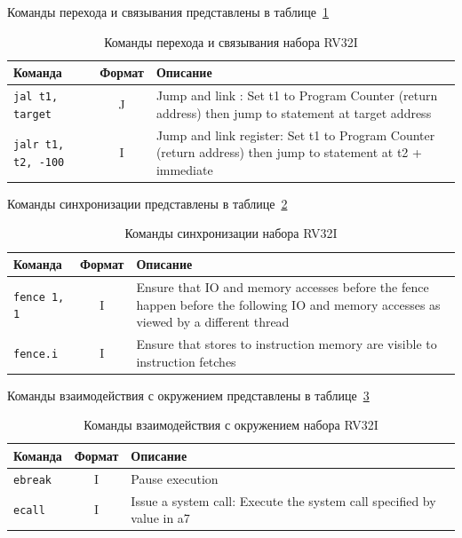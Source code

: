 Команды перехода и связывания представлены в таблице~\ref{table-base-jump}

\begin{table}[h]
    \caption{Команды перехода и связывания набора RV32I}
    \centering
    \begin{tabularx}{\textwidth}{|l|c|X|}
        \hline
        \textbf{Команда} & \textbf{Формат} & \textbf{Описание} \\
        \hline \verb|jal t1, target| & J & Jump and link : Set t1 to Program Counter (return address) then jump to statement at target address \\
        \hline \verb|jalr t1, t2, -100| & I & Jump and link register: Set t1 to Program Counter (return address) then jump to statement at t2 + immediate \\
        \hline
    \end{tabularx}
    \label{table-base-jump}
\end{table}

Команды синхронизации представлены в таблице~\ref{table-base-sync}

\begin{table}[h]
    \caption{Команды синхронизации набора RV32I}
    \centering
    \begin{tabularx}{\textwidth}{|l|c|X|}
        \hline
        \textbf{Команда} & \textbf{Формат} & \textbf{Описание} \\
        \hline \verb|fence 1, 1| & I & Ensure that IO and memory accesses before the fence happen before the following IO and memory accesses as viewed by a different thread \\
        \hline \verb|fence.i| & I & Ensure that stores to instruction memory are visible to instruction fetches \\
        \hline
    \end{tabularx}
    \label{table-base-sync}
\end{table}

Команды взаимодействия с окружением представлены в таблице~\ref{table-base-env}

\begin{table}[h]
    \caption{Команды взаимодействия с окружением набора RV32I}
    \centering
    \begin{tabularx}{\textwidth}{|l|c|X|}
        \hline
        \textbf{Команда} & \textbf{Формат} & \textbf{Описание} \\
        \hline \verb|ebreak| & I & Pause execution \\
        \hline \verb|ecall| & I & Issue a system call: Execute the system call specified by value in a7 \\
        \hline
    \end{tabularx}
    \label{table-base-env}
\end{table}

